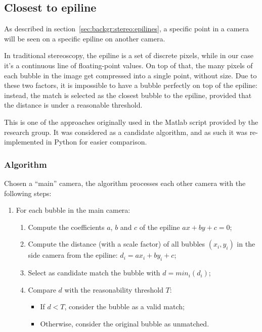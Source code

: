 \subsection{Closest to epiline}
\label{sec:match:epiline}

As described in section~\ref{sec:backgr:stereo:epilines}, a specific point in a camera will be seen on a specific epiline on another camera.

In traditional stereoscopy, the epiline is a set of discrete pixels, while in our case it's a continuous line of floating-point values.
On top of that, the many pixels of each bubble in the image get compressed into a single point, without size.
Due to these two factors, it is impossible to have a bubble perfectly on top of the epiline: instead, the match is selected as the closest bubble to the epiline, provided that the distance is under a reasonable threshold.

This is one of the approaches originally used in the Matlab script provided by the research group.
It was considered as a candidate algorithm, and as such it was re-implemented in Python for easier comparison.

\subsubsection{Algorithm}

Chosen a ``main'' camera, the algorithm processes each other camera with the following steps:
\begin{enumerate}
	\itemsep 0em
	\item For each bubble in the main camera:
	      \begin{enumerate}
		      \item Compute the coefficients $a$, $b$ and $c$ of the epiline $ax+by+c{=}0$;
		      \item Compute the distance (with a scale factor) of all bubbles $(x_i, y_i)$ in the side camera from the epiline: $d_i = ax_i + by_i + c$;
		      \item Select as candidate match the bubble with $d=min_i(d_i)$;
		      \item Compare $d$ with the reasonability threshold $T$:
		            \begin{itemize}
			            \item If $d<T$, consider the bubble as a valid match;
			            \item Otherwise, consider the original bubble as unmatched.
		            \end{itemize}
	      \end{enumerate}
\end{enumerate}

